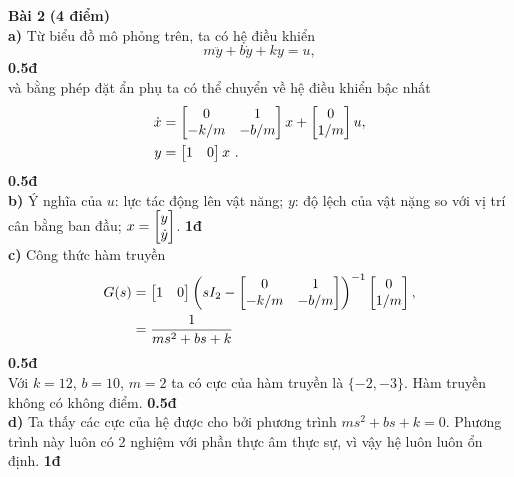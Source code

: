 \documentclass[11pt]{article}
\begin{document}
\vskip 2cm

\textbf{Bài 2} \textbf{(4 điểm)} \\
\textbf{a)} Từ biểu đồ mô phỏng trên, ta có hệ điều khiển
%
\begin{equation}
 m \ddot{y} + b \dot{y} + ky = u,  
\end{equation}
%
\hfill \textbf{0.5đ} \\
và bằng phép đặt ẩn phụ ta có thể chuyển về hệ điều khiển bậc nhất
%
\begin{align}
 	\dot{x} &= \begin{bmatrix} 0 & 1 \\ -k/m & -b/m \end{bmatrix} x + \begin{bmatrix} 0 \\ 1/m \end{bmatrix} u, \\
 	y &= \begin{bmatrix} 1 & 0 \end{bmatrix} x \ .
\end{align}
%
\hfill \textbf{0.5đ} \\
%
\textbf{b)} Ý nghĩa của $u$: lực tác động lên vật năng; $y$: độ lệch của vật nặng so với vị trí cân bằng ban đầu; $x=\begin{bmatrix} y \\ \dot{y} \end{bmatrix}$.
\hfill \textbf{1đ} \\
%
\textbf{c)} Công thức hàm truyền
%
\begin{align*}
G(s) &= \begin{bmatrix} 1 & 0 \end{bmatrix} \left( sI_2 - \begin{bmatrix} 0 & 1 \\ -k/m & -b/m \end{bmatrix} \right)^{-1} \begin{bmatrix} 0 \\ 1/m \end{bmatrix}, \\
     &= \dfrac{1}{ms^2+bs+k} 
\end{align*}
%
\hfill \textbf{0.5đ} \\
%
Với $k = 12$, $b = 10$, $m = 2$ ta có cực của hàm truyền là $\{-2,-3\}$. Hàm truyền không có không điểm.
\hfill \textbf{0.5đ} \\
%
\textbf{d)} Ta thấy các cực của hệ được cho bởi phương trình $ms^2 + bs + k = 0$. Phương trình này luôn có 2 nghiệm với phần thực âm thực sự, vì vậy hệ luôn luôn ổn định. 
\hfill \textbf{1đ} 
\end{document}

